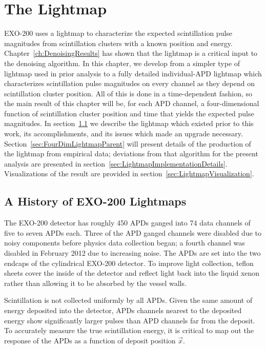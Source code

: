 \renewcommand{\thechapter}{6}
\chapter{The Lightmap}
\label{ch:Lightmap}

EXO-200 uses a lightmap to characterize the expected scintillation pulse magnitudes from scintillation clusters with a known position and energy.  Chapter~\ref{ch:DenoisingResults} has shown that the lightmap is a critical input to the denoising algorithm.  In this chapter, we develop from a simpler type of lightmap used in prior analysis to a fully detailed individual-APD lightmap which characterizes scintillation pulse magnitudes on every channel as they depend on scintillation cluster position.  All of this is done in a time-dependent fashion, so the main result of this chapter will be, for each APD channel, a four-dimensional function of scintillation cluster position and time that yields the expected pulse magnitudes.  In section~\ref{sec:LightmapHistory} we describe the lightmap which existed prior to this work, its accomplishments, and its issues which made an upgrade necessary.  Section~\ref{sec:FourDimLightmapParent} will present details of the production of the lightmap from empirical data; deviations from that algorithm for the present analysis are presented in section~\ref{sec:LightmapImplementationDetails}.  Visualizations of the result are provided in section~\ref{sec:LightmapVisualization}.

\section{A History of EXO-200 Lightmaps}\label{sec:LightmapHistory}

The EXO-200 detector has roughly 450 APDs ganged into 74 data channels of five to seven APDs each. Three of the APD ganged channels were disabled due to noisy components before physics data collection began; a fourth channel was disabled in February 2012 due to increasing noise.  The APDs are set into the two endcaps of the cylindrical EXO-200 detector.  To improve light collection, teflon sheets cover the inside of the detector and reflect light back into the liquid xenon rather than allowing it to be absorbed by the vessel walls.

Scintillation is not collected uniformly by all APDs.  Given the same amount of energy deposited into the detector, APDs channels nearest to the deposited energy show significantly larger pulses than APD channels far from the deposit.   To accurately measure the true scintillation energy, it is critical to map out the response of the APDs as a function of deposit position $\vec{x}$.

